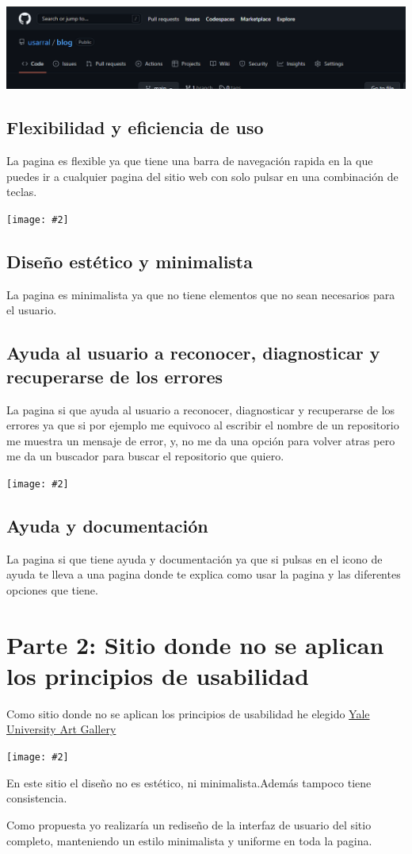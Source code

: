 \documentclass[a4paper,12pt]{article} %
\newcommand{\image}[2][1]{\texttt{[image: \#2]}}
\begin{document}
\includegraphics{04.png}

\subsection{Flexibilidad y eficiencia de uso}
La pagina es flexible ya que tiene una barra de navegación rapida en la que puedes ir a cualquier pagina del sitio web con solo pulsar en una combinación de teclas.

\image{05.png}

\subsection{Diseño estético y minimalista}
La pagina es minimalista ya que no tiene elementos que no sean necesarios para el usuario.


\subsection{Ayuda al usuario a reconocer, diagnosticar y recuperarse de los errores}
La pagina si que ayuda al usuario a reconocer, diagnosticar y recuperarse de los errores ya que si por ejemplo me equivoco al escribir el nombre de un repositorio me muestra un mensaje de error, y, no me da una opción para volver atras pero me da un buscador para buscar el repositorio que quiero.

\image{06.png}
\subsection{Ayuda y documentación}

La pagina si que tiene ayuda y documentación ya que si pulsas en el icono de ayuda te lleva a una pagina donde te explica como usar la pagina y las diferentes opciones que tiene.
\clearpage{}
\section{Parte 2: Sitio donde no se aplican los principios de usabilidad}
Como sitio donde no se aplican los principios de usabilidad he elegido \href{https://www.art.yale.edu/}{Yale University Art Gallery}

\image{07.png}

En este sitio el diseño no es estético, ni minimalista.Además tampoco tiene consistencia.

Como propuesta yo realizaría un rediseño de la interfaz de usuario del sitio completo, manteniendo un estilo minimalista y uniforme en toda la pagina.


\clearpage{}
\end{document}
